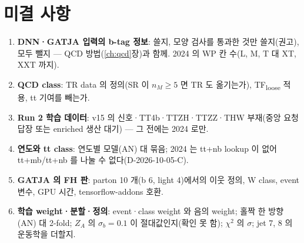 \section{미결 사항}\label{sec:mva-open}

\begin{openq}
\begin{enumerate}
\item \textbf{DNN·GATJA 입력의 b-tag 정보}: 쓸지, 모양 검사를 통과한 것만 쓸지(권고), 모두 뺄지 — QCD 방법(\ref{ch:qcd}장)과 함께. 2024 의 WP 칸 수(L, M, T 대 XT, XXT 까지).
\item \textbf{QCD class}: TR data 의 정의(SR 이 $n_M\ge5$ 면 TR 도 옮기는가), TF\textsubscript{loose} 적용, tt 기여를 빼는가.
\item \textbf{Run 2 학습 데이터}: v15 의 신호·TT4b·TTZH·TTZZ·THW 부재(중앙 요청 답장 또는 enriched 생산 대기) — 그 전에는 2024 로만.
\item \textbf{연도와 tt class}: 연도별 모델(AN) 대 묶음; 2024 는 tt+nb lookup 이 없어 tt+mb/tt+nb 를 나눌 수 없다(D-2026-10-05-C).
\item \textbf{GATJA 의 FH 판}: parton 10 개(b 6, light 4)에서의 이웃 정의, W class, event 변수, GPU 시간, tensorflow-addons 호환.
\item \textbf{학습 weight·분할·정의}: event·class weight 와 음의 weight; 홀짝 한 방향(AN) 대 2-fold; $Z_A$ 의 $\sigma_b=0.1$ 이 절대값인지(확인 못 함);
  $\chi^2$ 의 $\sigma$; jet 7, 8 의 운동학을 더할지.
\end{enumerate}
\end{openq}
